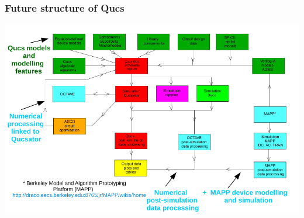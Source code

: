 \documentclass[9pt]{beamer}
\begin{document}
\begin{frame}
 \frametitle{Future structure of Qucs}
 \includegraphics[width=\textwidth]{img/Spice4qucsFig2.png}
\end{frame}
\end{document}
